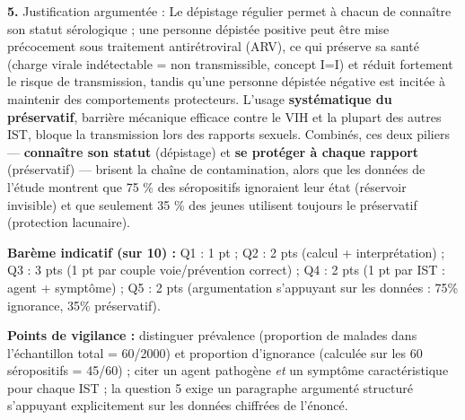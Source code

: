 \documentclass[11pt]{article}
\begin{document}
\begin{corrige}
\textbf{5.} Justification argumentée : Le dépistage régulier permet à chacun de connaître son statut sérologique ; une personne dépistée positive peut être mise précocement sous traitement antirétroviral (ARV), ce qui préserve sa santé (charge virale indétectable = non transmissible, concept I=I) et réduit fortement le risque de transmission, tandis qu'une personne dépistée négative est incitée à maintenir des comportements protecteurs. L'usage \textbf{systématique du préservatif}, barrière mécanique efficace contre le VIH et la plupart des autres IST, bloque la transmission lors des rapports sexuels. Combinés, ces deux piliers — \textbf{connaître son statut} (dépistage) et \textbf{se protéger à chaque rapport} (préservatif) — brisent la chaîne de contamination, alors que les données de l'étude montrent que 75 \% des séropositifs ignoraient leur état (réservoir invisible) et que seulement 35 \% des jeunes utilisent toujours le préservatif (protection lacunaire).

\textbf{Barème indicatif (sur 10) :} Q1 : 1 pt ; Q2 : 2 pts (calcul + interprétation) ; Q3 : 3 pts (1 pt par couple voie/prévention correct) ; Q4 : 2 pts (1 pt par IST : agent + symptôme) ; Q5 : 2 pts (argumentation s'appuyant sur les données : 75\% ignorance, 35\% préservatif).

\textbf{Points de vigilance :} distinguer prévalence (proportion de malades dans l'échantillon total = 60/2000) et proportion d'ignorance (calculée sur les 60 séropositifs = 45/60) ; citer un agent pathogène \emph{et} un symptôme caractéristique pour chaque IST ; la question 5 exige un paragraphe argumenté structuré s'appuyant explicitement sur les données chiffrées de l'énoncé.
\end{corrige}
\end{document}
